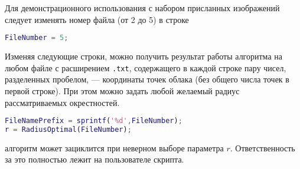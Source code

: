 
Для демонстрационного использования с набором присланных изображений следует изменять номер файла (от 2 до 5) в строке 
\begin{lstlisting}[language=matlab, frame=lines]
FileNumber = 5;
\end{lstlisting}

Изменяя следующие строки, можно получить результат работы алгоритма на любом файле с расширением \texttt{.txt}, содержащего в каждой строке пару чисел, разделенных пробелом, --- координаты точек облака (без общего числа точек в первой строке). При этом можно задать любой желаемый радиус рассматриваемых окрестностей. 
\begin{lstlisting}[language=matlab, frame=lines]
FileNamePrefix = sprintf('%d',FileNumber);
r = RadiusOptimal(FileNumber);
\end{lstlisting}
 алгоритм может зациклится при неверном выборе параметра $r$. Ответственность за это полностью лежит на пользователе скрипта.

